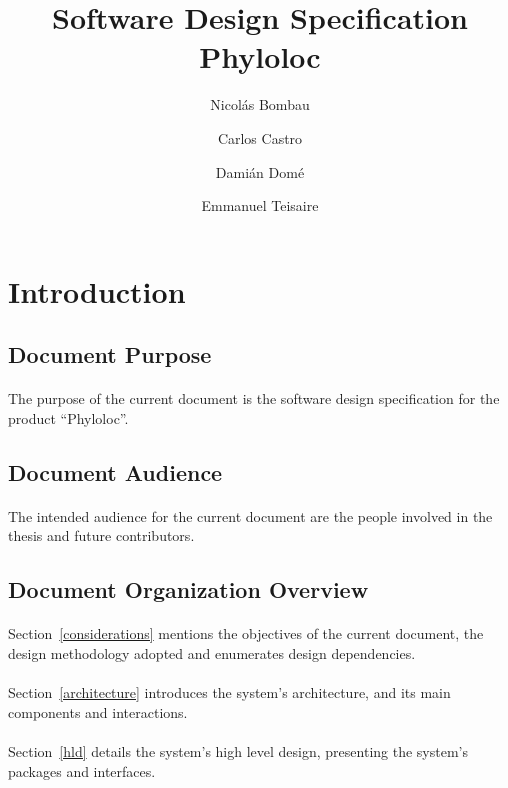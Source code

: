 \documentclass[a4paper,10pt]{article}
\author{Nicol\'as Bombau \and Carlos Castro \and Dami\'an Dom\'e \and Emmanuel Teisaire}
\title{Software Design Specification \\ Phyloloc}
\begin{document}
\maketitle
\newpage
\tableofcontents
\newpage
\section{Introduction}
  \subsection{Document Purpose}
  
\paragraph{}
The purpose of the current document is the software design specification for the product ``Phyloloc''.

\subsection{Document Audience}
  
\paragraph{}
The intended audience for the current document are the people involved in the thesis and future contributors.

\subsection{Document Organization Overview}

\paragraph{}
Section~\ref{considerations} mentions the objectives of the current document, the design methodology adopted and enumerates design dependencies.

\paragraph{}
Section~\ref{architecture} introduces the system's architecture, and its main components and interactions.

\paragraph{}
Section~\ref{hld} details the system's high level design, presenting the system's packages and interfaces.
\end{document}
